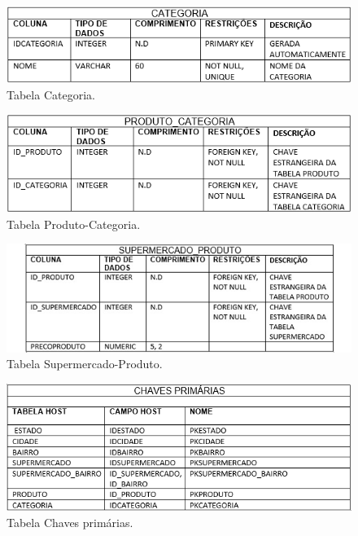 \begin{figure}[H]
    \centering
    \caption{Tabela Categoria.}
    \includegraphics[scale=0.64]{Imagens/TabelaCategoria.PNG}
\end{figure}
			
\begin{figure}[H]
	\centering
	\caption{Tabela Produto-Categoria.}
	\includegraphics[scale=0.64]{Imagens/TabelaProdutoCategoria.PNG}
\end{figure}
			
\begin{figure}[H]
	\centering
    \caption{Tabela Supermercado-Produto.}
    \includegraphics[scale=0.64]{Imagens/TabelaSupermercadoProduto.PNG}
\end{figure}
			
\begin{figure}[H]
	\centering
   	\caption{Tabela Chaves primárias.}
   	\includegraphics[scale=0.64]{Imagens/TabelaChavesPrimarias.PNG}
\end{figure}
			
